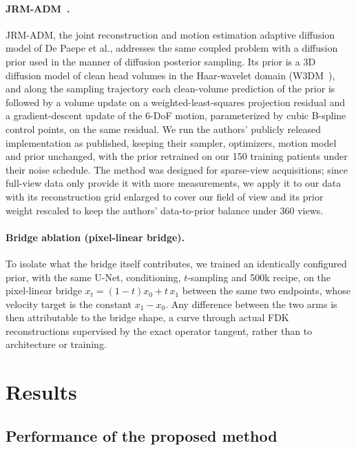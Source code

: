 \documentclass[11pt]{article}
\begin{document}
\paragraph{JRM-ADM~\cite{depaepe25}.}
JRM-ADM, the joint reconstruction and motion estimation adaptive diffusion model of De
Paepe et al., addresses the same coupled problem with a diffusion prior used in the manner of
diffusion posterior sampling. Its prior is a 3D diffusion model of clean head volumes in
the Haar-wavelet domain (W3DM~\cite{wdm24}), and along the sampling trajectory each
clean-volume prediction of the prior is followed by a volume update on a
weighted-least-squares projection residual and a gradient-descent update of the 6-DoF
motion, parameterized by cubic B-spline control points, on the same residual. We run the
authors' publicly released implementation as published, keeping their sampler,
optimizers, motion model and prior unchanged, with the prior retrained on our 150 training
patients under their noise schedule. The method was designed for sparse-view acquisitions;
since full-view data only provide it with more measurements, we apply it to our data with
its reconstruction grid enlarged to cover our field of view and its prior weight rescaled to
keep the authors' data-to-prior balance under 360 views.

\paragraph{Bridge ablation (pixel-linear bridge).}
To isolate what the bridge itself contributes, we trained an identically configured prior,
with the same U-Net, conditioning, $t$-sampling and 500k recipe, on the pixel-linear bridge
$x_t = (1-t)x_0 + t\,x_1$ between the same two endpoints, whose velocity target is the
constant $x_1 - x_0$. Any difference between the two arms is then attributable to the
bridge shape, a curve through actual FDK reconstructions supervised by the exact operator
tangent, rather than to architecture or training.

\section{Results}
\label{sec:results}

\subsection{Performance of the proposed method}
\label{sec:results-main}
\end{document}
